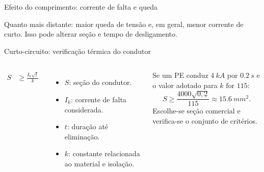 \begin{frame}{Efeito do comprimento: corrente de falta e queda}
\small
\centering
{}
\begin{caixaObs}
Quanto mais distante: maior queda de tensão e, em geral, menor corrente de curto. Isso pode alterar seção e tempo de desligamento.
\end{caixaObs}
\end{frame}

\begin{frame}{Curto-circuito: verificação térmica do condutor}
\small
\begin{columns}[T,onlytextwidth]
\begin{align*}
S &\ge \frac{I_k\sqrt{t}}{k}
\end{align*}
\begin{itemize}
\item $S$: seção do condutor.
\item $I_k$: corrente de falta considerada.
\item $t$: duração até eliminação.
\item $k$: constante relacionada ao material e isolação.
\end{itemize}
\begin{caixaEx}
Se um PE conduz $\SI{4}{kA}$ por $\SI{0.2}{s}$ e o valor adotado para $k$ for $115$:
\[
S\ge\frac{4000\sqrt{0{,}2}}{115}\approx\SI{15.6}{mm^2}.
\]
Escolhe-se seção comercial e verifica-se o conjunto de critérios.
\end{caixaEx}
\end{columns}
\end{frame}

